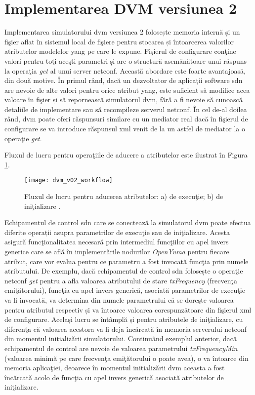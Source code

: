 \section{Implementarea DVM versiunea 2}

Implementarea simulatorului \gls{dvm} versiunea 2 folosește memoria internă și un fişier aflat în sistemul local de fişiere pentru stocarea și întoarcerea valorilor atributelor modelelor \gls{yang} pe care le expune. Fişierul de configurare conţine valori pentru toţi aceşti parametri și are o structură asemănătoare unui răspuns la operaţia \textit{get} al unui server \gls{netconf}. Această abordare este foarte avantajoasă, din două motive. În primul rând, dacă un dezvoltator de aplicații software \gls{sdn} are nevoie de alte valori pentru orice atribut \gls{yang}, este suficient să modifice acea valoare în fişier și să repornească simulatorul \gls{dvm}, fără a fi nevoie să cunoască detaliile de implementare sau să recompileze serverul \gls{netconf}. În cel de-al doilea rând, \gls{dvm} poate oferi răspunsuri similare cu un mediator real dacă în fişierul de configurare se va introduce răspunsul \gls{xml} venit de la un astfel de mediator la o operaţie \textit{get}.

Fluxul de lucru pentru operaţiile de aducere a atributelor este ilustrat în Figura \ref{fig:dvm_v02_workflow}.

\begin{figure}[h]
	\centering
	\texttt{[image: dvm\_v02\_workflow]}
	\caption{Fluxul de lucru pentru aducerea atributelor: a) de execuţie; b) de iniţializare \cite{stancu2017enabling}.}
	\label{fig:dvm_v02_workflow}
\end{figure}

Echipamentul de control \gls{sdn} care se conectează la simulatorul \gls{dvm} poate efectua diferite operații asupra parametrilor de execuţie sau de iniţializare. Acesta asigură funcţionalitatea necesară prin intermediul funcţiilor cu apel invers generice care se află în implementările nodurilor \textit{OpenYuma} pentru fiecare atribut, care vor evalua pentru ce parametru a fost invocată funcţia prin numele atributului. De exemplu, dacă echipamentul de control \gls{sdn} folosește o operaţie \gls{netconf} \textit{get} pentru a afla valoarea atributului de stare \textit{txFrequency} (frecvenţa emiţătorului), funcţia cu apel invers generică, asociată parametrilor de execuţie va fi invocată, va determina din numele parametrului că se doreşte valoarea pentru atributul respectiv și va întoarce valoarea corespunzătoare din fişierul \gls{xml} de configurare. Același lucru se întâmplă și pentru atributele de iniţializare, cu diferenţa că valoarea acestora va fi deja încărcată în memoria serverului \gls{netconf} din momentul inițializării simulatorului. Continuând exemplul anterior, dacă echipamentul de control are nevoie de valoarea parametrului \textit{txFrequencyMin} (valoarea minimă pe care frecvenţa emiţătorului o poate avea), o va întoarce din memoria aplicaţiei, deoarece în momentul inițializării \gls{dvm} aceasta a fost încărcată acolo de funcţia cu apel invers generică asociată atributelor de iniţializare.

